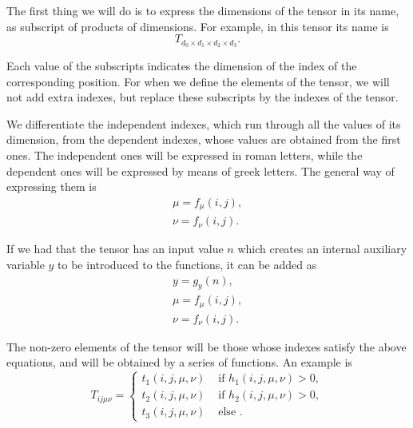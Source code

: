 The first thing we will do is to express the dimensions of the tensor in its name, as subscript of products of dimensions. For example, in this tensor its name is
\begin{equation}
    T_{d_0\times d_1\times d_2\times d_3}.
\end{equation}

Each value of the subscripts indicates the dimension of the index of the corresponding position. For when we define the elements of the tensor, we will not add extra indexes, but replace these subscripts by the indexes of the tensor.

We differentiate the independent indexes, which run through all the values of its dimension, from the dependent indexes, whose values are obtained from the first ones. The independent ones will be expressed in roman letters, while the dependent ones will be expressed by means of greek letters. The general way of expressing them is
\begin{equation}
    \begin{gathered}
        \mu = f_\mu(i,j),\\
        \nu = f_\nu(i,j).
    \end{gathered}
\end{equation}

If we had that the tensor has an input value $n$ which creates an internal auxiliary variable $y$ to be introduced to the functions, it can be added as
\begin{equation}
    \begin{gathered}
        y = g_y(n),\\
        \mu = f_\mu(i,j),\\
        \nu = f_\nu(i,j).
    \end{gathered}
\end{equation}

The non-zero elements of the tensor will be those whose indexes satisfy the above equations, and will be obtained by a series of functions. An example is 
\begin{equation}
    T_{ij\mu\nu} =
    \begin{cases} 
    t_1(i,j,\mu,\nu)&\text{ if }  h_1(i,j,\mu,\nu)>0,\\
    t_2(i,j,\mu,\nu)&\text{ if }  h_2(i,j,\mu,\nu)>0,\\
    t_3(i,j,\mu,\nu)&\text{ else }.
   \end{cases}
\end{equation}


